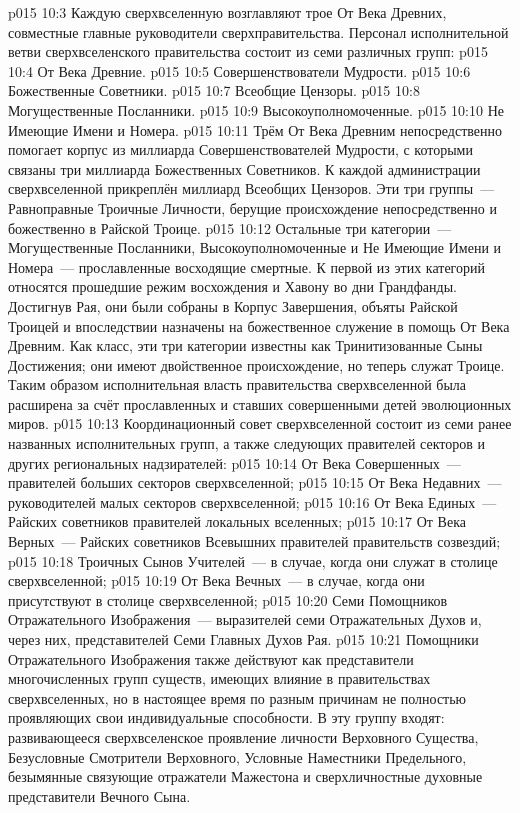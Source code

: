 \vs p015 10:3 \pc Каждую сверхвселенную возглавляют трое От Века Древних, совместные главные руководители сверхправительства. Персонал исполнительной ветви сверхвселенского правительства состоит из семи различных групп:
\vs p015 10:4 От Века Древние.
\vs p015 10:5 Совершенствователи Мудрости.
\vs p015 10:6 Божественные Советники.
\vs p015 10:7 Всеобщие Цензоры.
\vs p015 10:8 Могущественные Посланники.
\vs p015 10:9 Высокоуполномоченные.
\vs p015 10:10 Не Имеющие Имени и Номера.
\vs p015 10:11 \pc Трём От Века Древним непосредственно помогает корпус из миллиарда Совершенствователей Мудрости, с которыми связаны три миллиарда Божественных Советников. К каждой администрации сверхвселенной прикреплён миллиард Всеобщих Цензоров. Эти три группы~--- Равноправные Троичные Личности, берущие происхождение непосредственно и божественно в Райской Троице.
\vs p015 10:12 Остальные три категории~--- Могущественные Посланники, Высокоуполномоченные и Не Имеющие Имени и Номера~--- прославленные восходящие смертные. К первой из этих категорий относятся прошедшие режим восхождения и Хавону во дни Грандфанды. Достигнув Рая, они были собраны в Корпус Завершения, объяты Райской Троицей и впоследствии назначены на божественное служение в помощь От Века Древним. Как класс, эти три категории известны как Тринитизованные Сыны Достижения; они имеют двойственное происхождение, но теперь служат Троице. Таким образом исполнительная власть правительства сверхвселенной была расширена за счёт прославленных и ставших совершенными детей эволюционных миров.
\vs p015 10:13 Координационный совет сверхвселенной состоит из семи ранее названных исполнительных групп, а также следующих правителей секторов и других региональных надзирателей:
\vs p015 10:14 От Века Совершенных~--- правителей больших секторов сверхвселенной;
\vs p015 10:15 От Века Недавних~--- руководителей малых секторов сверхвселенной;
\vs p015 10:16 От Века Единых~--- Райских советников правителей локальных вселенных;
\vs p015 10:17 От Века Верных~--- Райских советников Всевышних правителей правительств созвездий;
\vs p015 10:18 Троичных Сынов Учителей~--- в случае, когда они служат в столице сверхвселенной;
\vs p015 10:19 От Века Вечных~--- в случае, когда они присутствуют в столице сверхвселенной;
\vs p015 10:20 Семи Помощников Отражательного Изображения~--- выразителей семи Отражательных Духов и, через них, представителей Семи Главных Духов Рая.
\vs p015 10:21 \pc Помощники Отражательного Изображения также действуют как представители многочисленных групп существ, имеющих влияние в правительствах сверхвселенных, но в настоящее время по разным причинам не полностью проявляющих свои индивидуальные способности. В эту группу входят: развивающееся сверхвселенское проявление личности Верховного Существа, Безусловные Смотрители Верховного, Условные Наместники Предельного, безымянные связующие отражатели Мажестона и сверхличностные духовные представители Вечного Сына.
